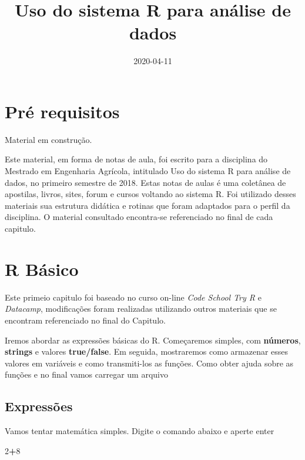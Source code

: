 \documentclass[]{book}
\title{Uso do sistema R para análise de dados}
\author{}
\date{2020-04-11}
\newenvironment{Shaded}{\begin{snugshade}}{\end{snugshade}}
\newcommand{\DecValTok}[1]{\textcolor[rgb]{0.00,0.00,0.81}{#1}}
\newcommand{\OperatorTok}[1]{\textcolor[rgb]{0.81,0.36,0.00}{\textbf{#1}}}
\begin{document}
\maketitle

{
\setcounter{tocdepth}{1}
\tableofcontents
}
\hypertarget{pre-requisitos}{%
\chapter{Pré requisitos}\label{pre-requisitos}}

Material em construção.

Este material, em forma de notas de aula, foi escrito para a disciplina do Mestrado em Engenharia Agrícola, intitulado Uso do sistema R para análise de dados, no primeiro semestre de 2018.
Estas notas de aulas é uma coletânea de apostilas, livros, sites, forum e cursos voltando ao sistema R. Foi utilizado desses materiais sua estrutura didática e rotinas que foram adaptados para o perfil da disciplina.
O material consultado encontra-se referenciado no final de cada capitulo.

\hypertarget{intro}{%
\chapter{R Básico}\label{intro}}

Este primeio capitulo foi baseado no curso on-line \emph{Code School Try R} e \emph{Datacamp}, modificações foram realizadas utilizando outros materiais que se encontram referenciado no final do Capitulo.

Iremos abordar as expressões básicas do R.
Começaremos simples, com \textbf{números}, \textbf{strings} e valores \textbf{true/false}. Em seguida, mostraremos como armazenar esses valores em variáveis e como transmiti-los as funções. Como obter ajuda sobre as funções e no final vamos carregar um arquivo

\hypertarget{expressoes}{%
\section{Expressões}\label{expressoes}}

Vamos tentar matemática simples. Digite o comando abaixo e aperte enter

\begin{Shaded}
\begin{Highlighting}[]
\DecValTok{2}\OperatorTok{+}\DecValTok{8}
\end{Highlighting}
\end{Shaded}
\end{document}
